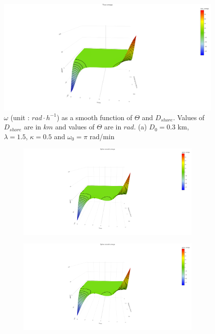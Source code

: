 \documentclass[11pt]{article}
\newcommand {\1}{\mathbb{1}}
\begin{document}
\begin{figure}[H]
	\centering
		\centering
		\includegraphics[scale=0.25]{images/simulation study/true_smooth_omega_rect.png}
		\caption{$\omega$ (unit : $rad \cdot h^{-1}$) as a smooth function of $\Theta$ and $D_{shore}$. Values of $D_{shore}$ are in $km$ and values of $\Theta$ are in $rad$.
			(a) $D_0=0.3$ km, $\lambda=1.5$, $\kappa=0.5$ and $\omega_0=\pi$ rad/min}
		\label{fig: trueomega}
\end{figure}

\begin{figure}[H]
	\begin{subfigure}{0.48\textwidth}
		\centering
		\includegraphics[scale=0.12]{images/simulation study/spline_smooth_omega_rect.png}
		\caption{}
	\end{subfigure}
	\begin{subfigure}{0.48\textwidth}
		\centering
		\includegraphics[scale=0.12]{images/simulation study/spline_smooth_omega_rect.png}
		\caption{}
	\end{subfigure}
	\caption{}
	\label{fig: splineomega}
\end{figure}
\end{document}
